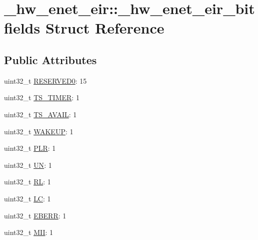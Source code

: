 \hypertarget{struct__hw__enet__eir_1_1__hw__enet__eir__bitfields}{}\section{\+\_\+hw\+\_\+enet\+\_\+eir\+:\+:\+\_\+hw\+\_\+enet\+\_\+eir\+\_\+bitfields Struct Reference}
\label{struct__hw__enet__eir_1_1__hw__enet__eir__bitfields}
\subsection*{Public Attributes}
\begin{DoxyCompactItemize}
\item 
uint32\+\_\+t \hyperlink{struct__hw__enet__eir_1_1__hw__enet__eir__bitfields_a156124cbe0a1a144a11d589f6cf3c4d2}{R\+E\+S\+E\+R\+V\+E\+D0}\+: 15
\item 
uint32\+\_\+t \hyperlink{struct__hw__enet__eir_1_1__hw__enet__eir__bitfields_af80de05c1e71736115c38868f85e3aa9}{T\+S\+\_\+\+T\+I\+M\+ER}\+: 1
\item 
uint32\+\_\+t \hyperlink{struct__hw__enet__eir_1_1__hw__enet__eir__bitfields_a2729cd74ef03c555b9034d09473f9b1d}{T\+S\+\_\+\+A\+V\+A\+IL}\+: 1
\item 
uint32\+\_\+t \hyperlink{struct__hw__enet__eir_1_1__hw__enet__eir__bitfields_a694d7d32077d2079560c5e98c108e5c0}{W\+A\+K\+E\+UP}\+: 1
\item 
uint32\+\_\+t \hyperlink{struct__hw__enet__eir_1_1__hw__enet__eir__bitfields_a764caebf362bb8e434e85f33f3531dfe}{P\+LR}\+: 1
\item 
uint32\+\_\+t \hyperlink{struct__hw__enet__eir_1_1__hw__enet__eir__bitfields_a2e7e34896d53bd8d164a6c4515780c1f}{UN}\+: 1
\item 
uint32\+\_\+t \hyperlink{struct__hw__enet__eir_1_1__hw__enet__eir__bitfields_aed4d9022875863c7cea708bf7ec5749c}{RL}\+: 1
\item 
uint32\+\_\+t \hyperlink{struct__hw__enet__eir_1_1__hw__enet__eir__bitfields_a7f18eac733024d40da86351c25f0cf50}{LC}\+: 1
\item 
uint32\+\_\+t \hyperlink{struct__hw__enet__eir_1_1__hw__enet__eir__bitfields_acca6d8542cbb731d87d5e4f0573b1971}{E\+B\+E\+RR}\+: 1
\item 
uint32\+\_\+t \hyperlink{struct__hw__enet__eir_1_1__hw__enet__eir__bitfields_a90e2b9155ace6040a64b4b77298928e2}{M\+II}\+: 1
\item 

\end{DoxyCompactItemize}
